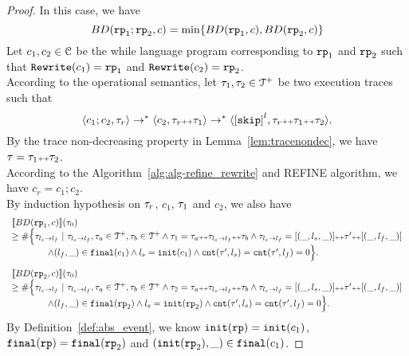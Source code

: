 \begin{proof}
In this case, we have
\[
  BD(\rprog_1; \rprog_2, c) = \min \left\{BD(\rprog_1, c), BD(\rprog_2, c) \right\}
\]
Let $c_1, c_2 \in \mathcal{C}$ be the while language program corresponding to $\mathtt{rp}_1$ and $\mathtt{rp}_2$ such that $\mathtt{Rewrite}(c_1) = \mathtt{rp}_1$ and $\mathtt{Rewrite}(c_2) = \mathtt{rp}_2$.
\\
According to the operational semantics, let $\mathtt{\tau}_1, \mathtt{\tau}_2 \in \mathcal{T}^{+}$ be two execution traces such that 
\[
  \config{c_1; c_2, \trace_r} \to^* \config{c_2, \trace_r \tracecat \trace_1} \to^* \config{\clabel{\eskip}^{l}, \trace_r \tracecat \trace_1 \tracecat \trace_2}.
\]
By the trace non-decreasing property in Lemma~\ref{lem:tracenondec}, we have $\mathtt{\tau} = \mathtt{\tau}_1 {\scriptscriptstyle ++} \mathtt{\tau}_2$.
\\
According to the Algorithm~\ref{alg:alg-refine_rewrite} and REFINE algorithm, we have $c_r = c_1; c_2$.
\\
By induction hypothesis on $\mathtt{\tau}_r$, $c_1$, $\mathtt{\tau}_1$ and $c_2$, we also have
\[
  \begin{array}{l}
    \llbracket BD(\mathtt{rp}_1, c) \rrbracket(\mathtt{\tau}_0)
    \\ \geq
    \# \Big\{\mathtt{\tau}_{l_s \to l_f} ~\vert~ \mathtt{\tau}_{l_s \to l_f}, \mathtt{\tau}_a \in \mathcal{T}^{+}, \mathtt{\tau}_b \in \mathcal{T}^{+}
    \land \mathtt{\tau}_1 = \mathtt{\tau}_a {\scriptscriptstyle ++} \mathtt{\tau}_{l_s \to l_f} {\scriptscriptstyle ++} \mathtt{\tau}_b
    \land \mathtt{\tau}_{l_s \to l_f} = [(\_, l_s, \_)] {\scriptscriptstyle ++} \mathtt{\tau}' {\scriptscriptstyle ++} [(\_, l_f, \_)]
    \\ \qquad \qquad
    \land (l_{f}, \_) \in \mathtt{final}(c_1)
    \land l_s = \mathtt{init}(c_1)
    \land \mathtt{cnt}(\mathtt{\tau}', l_s) = \mathtt{cnt}(\mathtt{\tau}', l_f) = 0 
    \Big\}.
    \end{array}
\]
%
\[
  \begin{array}{l}
    \llbracket BD(\mathtt{rp}_2, c) \rrbracket(\mathtt{\tau}_0)
    \\ \geq
    \# \Big\{\mathtt{\tau}_{l_s \to l_f} ~\vert~ \mathtt{\tau}_{l_s \to l_f}, \mathtt{\tau}_a \in \mathcal{T}^{+}, \mathtt{\tau}_b \in \mathcal{T}^{+}
    \land \mathtt{\tau}_2 = \mathtt{\tau}_a {\scriptscriptstyle ++} \mathtt{\tau}_{l_s \to l_f} {\scriptscriptstyle ++} \mathtt{\tau}_b
    \land \mathtt{\tau}_{l_s \to l_f} = [(\_, l_s, \_)] {\scriptscriptstyle ++} \mathtt{\tau}' {\scriptscriptstyle ++} [(\_, l_f, \_)]
    \\ \qquad \qquad
    \land (l_{f}, \_) \in \mathtt{final}(\mathtt{rp}_2)
    \land l_s = \mathtt{init}(\mathtt{rp}_2)
    \land \mathtt{cnt}(\mathtt{\tau}', l_s) = \mathtt{cnt}(\mathtt{\tau}', l_f) = 0 
    \Big\}.
    \end{array}
\]
By Definition~\ref{def:abs_event}, we know
$\mathtt{init}(\mathtt{rp}) = \mathtt{init}(c_1)$, $\mathtt{final}(\mathtt{rp}) = \mathtt{final}(\mathtt{rp}_2)$ and $(\mathtt{init}(\mathtt{rp}_2), \_) \in \mathtt{final}(c_1)$. 

\end{proof}

